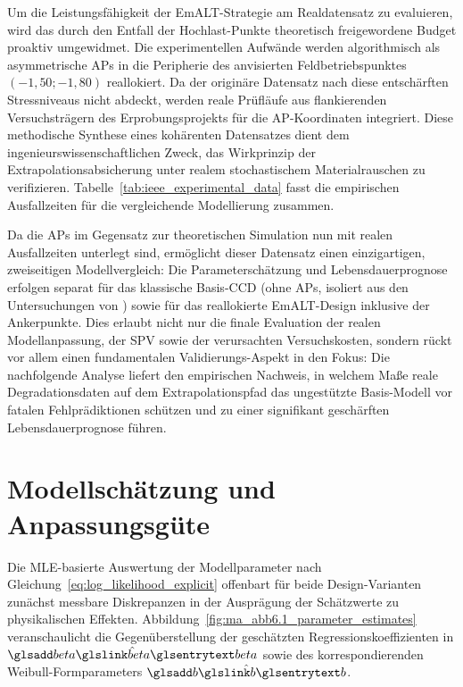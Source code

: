 Um die Leistungsfähigkeit der \ac{EmALT}-Strategie am Realdatensatz zu evaluieren, wird das durch den Entfall der Hochlast-Punkte theoretisch freigewordene Budget proaktiv umgewidmet.
Die experimentellen Aufwände werden algorithmisch als asymmetrische \acp{AP} in die Peripherie des anvisierten Feldbetriebspunktes $(-1{,}50; -1{,}80)$ reallokiert.
Da der originäre Datensatz nach \textcite{Arndt.2026} diese entschärften Stressniveaus nicht abdeckt, werden reale Prüfläufe aus flankierenden Versuchsträgern des Erprobungsprojekts für die \ac{AP}-Koordinaten integriert.
Diese methodische Synthese eines kohärenten Datensatzes dient dem ingenieurswissenschaftlichen Zweck, das Wirkprinzip der Extrapolationsabsicherung unter realem stochastischem Materialrauschen zu verifizieren.
Tabelle~\ref{tab:ieee_experimental_data} fasst die empirischen Ausfallzeiten für die vergleichende Modellierung zusammen.

Da die \acp{AP} im Gegensatz zur theoretischen Simulation nun mit realen Ausfallzeiten unterlegt sind, ermöglicht dieser Datensatz einen einzigartigen, zweiseitigen Modellvergleich:
Die Parameterschätzung und Lebensdauerprognose erfolgen separat für das klassische Basis-\ac{CCD} (ohne \acp{AP}, isoliert aus den Untersuchungen von \textcite{Arndt.2026}) sowie für das reallokierte \ac{EmALT}-Design inklusive der Ankerpunkte.
Dies erlaubt nicht nur die finale Evaluation der realen Modellanpassung, der \ac{SPV} sowie der verursachten Versuchskosten, sondern rückt vor allem einen fundamentalen Validierungs-Aspekt in den Fokus:
Die nachfolgende Analyse liefert den empirischen Nachweis, in welchem Maße reale Degradationsdaten auf dem Extrapolationspfad das ungestützte Basis-Modell vor fatalen Fehlprädiktionen schützen und zu einer signifikant geschärften Lebensdauerprognose führen.

\section{Modellschätzung und Anpassungsgüte} \label{sec:case_evaluation}

Die \ac{MLE}-basierte Auswertung der Modellparameter nach Gleichung~\eqref{eq:log_likelihood_explicit} offenbart für beide Design-Varianten zunächst messbare Diskrepanzen in der Ausprägung der Schätzwerte zu physikalischen Effekten.
Abbildung~\ref{fig:ma_abb6.1_parameter_estimates} veranschaulicht die Gegenüberstellung der geschätzten Regressionskoeffizienten in $\hat{\sym{beta}}$ sowie des korrespondierenden Weibull-Formparameters $\hat{\sym{b}}$.

